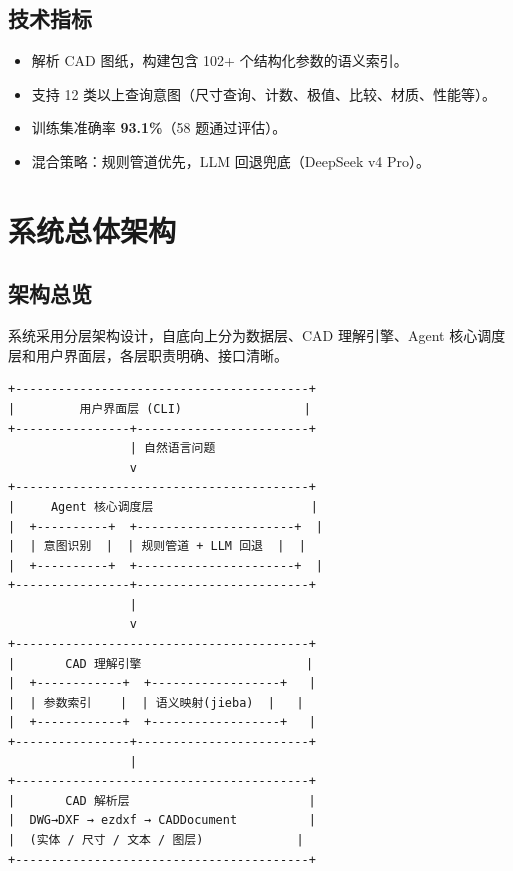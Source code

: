 \documentclass[11pt,a4paper]{article}
\begin{document}
\subsection{技术指标}

\begin{itemize}[nosep]
  \item 解析 CAD 图纸，构建包含 102+ 个结构化参数的语义索引。
  \item 支持 12 类以上查询意图（尺寸查询、计数、极值、比较、材质、性能等）。
  \item 训练集准确率 \textbf{93.1\%}（58 题通过评估）。
  \item 混合策略：规则管道优先，LLM 回退兜底（DeepSeek v4 Pro）。
\end{itemize}

\section{系统总体架构}

\subsection{架构总览}

系统采用分层架构设计，自底向上分为数据层、CAD 理解引擎、Agent 核心调度层和用户界面层，各层职责明确、接口清晰。

\begin{lstlisting}[language={},frame=single,title=系统架构图]
+-----------------------------------------+
|         用户界面层 (CLI)                 |
+----------------+------------------------+
                 | 自然语言问题
                 v
+-----------------------------------------+
|     Agent 核心调度层                      |
|  +----------+  +----------------------+  |
|  | 意图识别  |  | 规则管道 + LLM 回退  |  |
|  +----------+  +----------------------+  |
+----------------+------------------------+
                 |
                 v
+-----------------------------------------+
|       CAD 理解引擎                       |
|  +------------+  +------------------+   |
|  | 参数索引    |  | 语义映射(jieba)  |   |
|  +------------+  +------------------+   |
+----------------+------------------------+
                 |
+-----------------------------------------+
|       CAD 解析层                         |
|  DWG→DXF → ezdxf → CADDocument          |
|  (实体 / 尺寸 / 文本 / 图层)             |
+-----------------------------------------+
\end{lstlisting}
\end{document}
